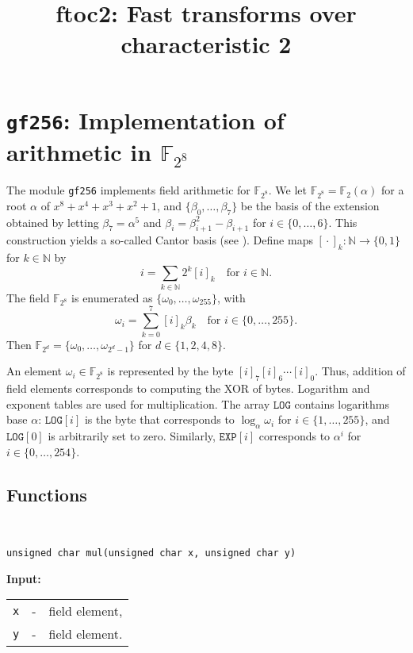 \documentclass{amsart}
\makeatletter
\newcommand{\F}{\mathbb{F}}
\newcommand{\N}{\mathbb{N}}
\newcommand{\Input}{\textbf{Input:}}
\newcommand{\field}{\normalfont\texttt{gf256}}
\newenvironment{inputs}{\Input\par\begin{tabular}{@{}rcl}}{\end{tabular}}
\makeatother
\begin{document}
	
\title{\lowercase{ftoc2}: Fast transforms over characteristic 2}
\maketitle

\section{\field{}: Implementation of arithmetic in $\F_{2^8}$}

The module \field{} implements field arithmetic for $\F_{2^8}$. We let
$\F_{2^8}=\F_2(\alpha)$ for a root $\alpha$ of $x^8+x^4+x^3+x^2+1$, and
$\{\beta_0,\dotsc,\beta_7\}$ be the basis of the extension obtained by letting
$\beta_7=\alpha^5$ and $\beta_i=\beta^2_{i+1}-\beta_{i+1}$ for
$i\in\{0,\dotsc,6\}$. This construction yields a so-called Cantor basis (see
\cite[Appendix~A]{gao2010}). Define maps $[{}\cdot{}]_k:\N\rightarrow\{0,1\}$
for $k\in\N$ by
\begin{equation*}
	i=\sum_{k\in\N}2^k[i]_k
	\quad\text{for $i\in\N$}.
\end{equation*}
The field $\F_{2^8}$ is enumerated as $\{\omega_0,\dotsc,\omega_{255}\}$, with
\begin{equation*}
	\omega_i=\sum^7_{k=0}[i]_k\beta_k
	\quad\text{for $i\in\{0,\dotsc,255\}$}.
\end{equation*}
Then $\F_{2^d}=\{\omega_0,\dotsc,\omega_{2^d-1}\}$ for $d\in\{1,2,4,8\}$.

An element $\omega_i\in\F_{2^8}$ is represented by the byte
$[i]_7[i]_6\dotsb[i]_0$. Thus, addition of field elements corresponds to
computing the XOR of bytes. Logarithm and exponent tables are used for
multiplication. The array $\texttt{LOG}$ contains logarithms base $\alpha$:
$\texttt{LOG}[i]$ is the byte that corresponds to $\log_\alpha\omega_i$ for
$i\in\{1,\dotsc,255\}$, and $\texttt{LOG}[0]$ is arbitrarily set to zero.
Similarly, $\texttt{EXP}[i]$ corresponds to $\alpha^i$ for
$i\in\{0,\dotsc,254\}$. 

\subsection{Functions}\

\texttt{unsigned char mul(unsigned char x, unsigned char y)}

\begin{inputs}
	\texttt{x} & - & field element, \\
	\texttt{y} & - & field element.
\end{inputs}
\end{document}
